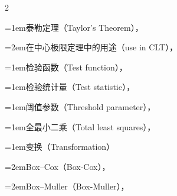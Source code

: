 \begin{multicols}{2}
\par\addvspace{2pt}
\par\noindent\hangindent=1em\hspace*{0em}\label{idx:1030}泰勒定理（Taylor’s Theorem），\hyperref[thm:5.5.21]{\pageref*{thm:5.5.21}}\par
\par\noindent\hangindent=2em\hspace*{1em}\label{idx:1031}在中心极限定理中的用途（use in CLT），\hyperref[idxocc:1031:224]{\pageref*{idxocc:1031:224}}\par
\par\addvspace{2pt}
\par\noindent\hangindent=1em\hspace*{0em}\label{idx:1032}检验函数（Test function），\hyperref[idxocc:1032:346]{\pageref*{idxocc:1032:346}}\par
\par\addvspace{2pt}
\par\noindent\hangindent=1em\hspace*{0em}\label{idx:1033}检验统计量（Test statistic），\hyperref[idxocc:1033:334]{\pageref*{idxocc:1033:334}}\par
\par\addvspace{2pt}
\par\noindent\hangindent=1em\hspace*{0em}\label{idx:1034}阈值参数（Threshold parameter），\hyperref[ex:3.5.3]{\pageref*{ex:3.5.3}}\par
\par\addvspace{2pt}
\par\noindent\hangindent=1em\hspace*{0em}\label{idx:1035}全最小二乘（Total least squares），\hyperref[idxocc:1035:501]{\pageref*{idxocc:1035:501}}\par
\par\addvspace{2pt}
\par\noindent\hangindent=1em\hspace*{0em}\label{idx:1036}变换（Transformation）\par
\par\noindent\hangindent=2em\hspace*{1em}\label{idx:1037}Box–Cox（Box-Cox），\hyperref[exercise:7.16]{\pageref*{exercise:7.16}}\par
\par\noindent\hangindent=2em\hspace*{1em}\label{idx:1038}Box–Muller（Box-Muller），\hyperref[ex:5.6.4]{\pageref*{ex:5.6.4}}\par

\end{multicols}
